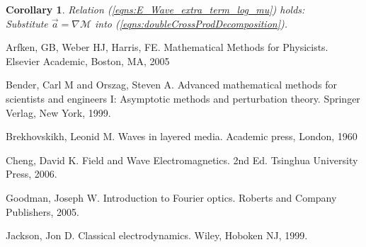 \documentclass[twocolumn,secnumarabic,amssymb, nobibnotes, aps, prd]{revtex4-1}
\newtheorem{cor}{Corollary}[subsubsection]
\begin{document}
\begin{cor} Relation (\ref{eqns:E_Wave_extra_term_log_mu}) holds:\\
Substitute $\overrightarrow{a} = \nabla\mathcal{M}$ into (\ref{eqns:doubleCrossProdDecomposition}). 

\end{cor}













%

\begin{thebibliography}{2d}

Arfken, GB, Weber HJ,  Harris, FE. Mathematical Methods for Physicists. Elsevier Academic, Boston, MA, 2005

Bender, Carl M and Orszag, Steven A. Advanced mathematical methods for scientists and engineers I: Asymptotic methods and perturbation theory. Springer Verlag, New York, 1999.

Brekhovskikh, Leonid M. Waves in layered media. Academic press, London, 1960


Cheng, David K. Field and Wave Electromagnetics. 2nd Ed. Tsinghua University Press, 2006.

Goodman, Joseph W. Introduction to Fourier optics. Roberts and Company Publishers, 2005.

Jackson, Jon D. Classical electrodynamics. Wiley, Hoboken NJ, 1999.





  


\end{thebibliography}


%	
%
%
%

%
%
%
\end{document}
